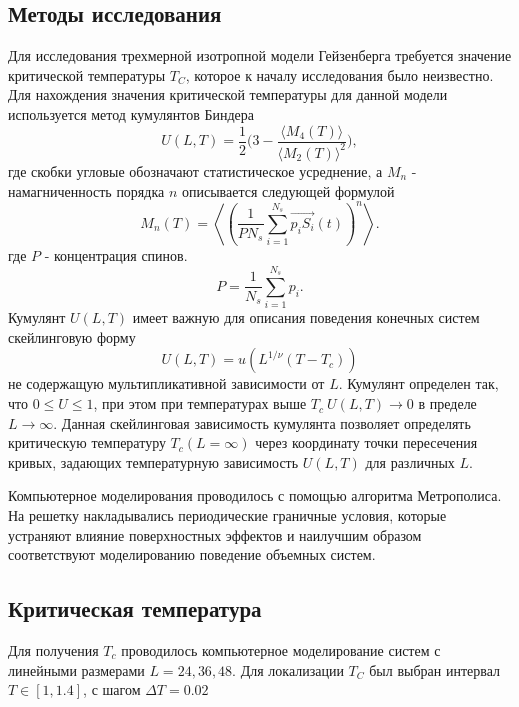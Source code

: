 \documentclass[a4paper,14pt]{extarticle}
\begin{document}
\subsection{Методы исследования}
Для исследования трехмерной изотропной модели Гейзенберга требуется значение критической температуры $T_C$,  которое к началу исследования было неизвестно. Для нахождения значения критической температуры для данной модели используется метод кумулянтов Биндера
\begin{equation}
U(L, T)=\frac{1}{2} \Biggl( 3-\frac{\langle M_4(T)\rangle}{{\langle M_2(T)\rangle}^2} \Biggr),
\end{equation}
где скобки угловые обозначают статистическое усреднение, а $M_n$ - намагниченность порядка $n$ описывается следующей формулой
\begin{equation}
 M_n(T) = \left\langle \left( \frac{1}{PN_s} \sum_{i=1}^{N_s} \overrightarrow{p_iS_i}(t) \right)^n \right\rangle.
\end{equation}
где $P$ - концентрация спинов.
\begin{equation}
	P = \frac{1}{N_s}\sum_{i=1}^{N_s}p_i.
\end{equation}
Кумулянт $ U(L, T) $ имеет важную для описания поведения конечных систем скейлинговую форму
\begin{equation} \label{eq2}
U(L, T) = u (L^{1 / \nu} (T - T_c))
\end{equation}
не содержащую мультипликативной зависимости от $ L $. Кумулянт определен так, что $ 0 \leq U \leq 1 $, при этом при температурах выше $ T_c \ U(L,T) \rightarrow 0$ в пределе $ L \rightarrow \infty $. Данная скейлинговая зависимость кумулянта позволяет определять критическую температуру $ T_c (L=\infty) $ через координату точки пересечения кривых, задающих температурную зависимость $ U(L, T) $ для различных $ L $. 

 
 
 
 Компьютерное моделирования проводилось с помощью алгоритма Метрополиса. На решетку накладывались периодические граничные условия, которые устраняют влияние поверхностных эффектов и наилучшим образом соответствуют моделированию поведение объемных систем.

\subsection{Критическая температура}
Для получения $T_c$ проводилось компьютерное моделирование систем с линейными размерами $L = 24, 36, 48$. 
Для локализации $T_C$ был выбран интервал $T \in [1, 1.4]$, с шагом $\Delta T = 0.02$
\end{document}
